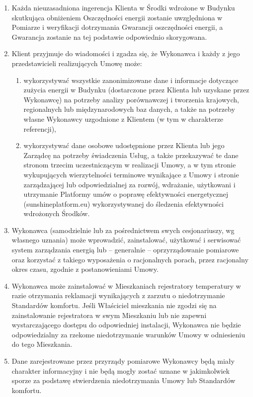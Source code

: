 \begin{multicols}{2}
\begin{enumerate}
	\item Każda nieuzasadniona ingerencja Klienta w Środki wdrożone w Budynku skutkująca obniżeniem Oszczędności energii zostanie uwzględniona w Pomiarze i weryfikacji dotrzymania Gwarancji oszczędności energii, a Gwarancja zostanie na tej podstawie odpowiednio skorygowana.
	\item Klient przyjmuje do wiadomości i zgadza się, że Wykonawca i każdy z jego przedstawicieli realizujących Umowę może:
	\begin{enumerate}
		\item wykorzystywać wszystkie zanonimizowane dane i informacje dotyczące zużycia energii w Budynku (dostarczone przez Klienta lub uzyskane przez Wykonawcę) na potrzeby analizy porównawczej i tworzenia krajowych, regionalnych lub międzynarodowych baz danych, a także na potrzeby własne Wykonawcy uzgodnione z Klientem (w tym w charakterze referencji),
		\item wykorzystywać dane osobowe udostępnione przez Klienta lub jego Zarządcę na potrzeby świadczenia Usług, a także przekazywać te dane stronom trzecim uczestniczącym w realizacji Umowy, a w tym stronie wykupujących wierzytelności terminowe wynikające z Umowy i stronie zarządzającej lub odpowiedzialnej za rozwój, wdrażanie, użytkowani i utrzymanie Platformy umów o poprawę efektywności energetycznej (sunshineplatform.eu) wykorzystywanej do śledzenia efektywności wdrożonych Środków.
	\end{enumerate}
	\item Wykonawca (samodzielnie lub za pośrednictwem swych cesjonariuszy, wg własnego uznania) może wprowadzić, zainstalować, użytkować i serwisować system zarządzania energią lub – generalnie – oprzyrządowanie pomiarowe oraz korzystać z takiego wyposażenia o racjonalnych porach, przez racjonalny okres czasu, zgodnie z postanowieniami Umowy.
	\item Wykonawca może zainstalować w Mieszkaniach rejestratory temperatury w razie otrzymania reklamacji wynikających z zarzutu o niedotrzymanie Standardów komfortu. Jeśli Właściciel mieszkania nie zgodzi się na zainstalowanie rejestratora w swym Mieszkaniu lub nie zapewni wystarczającego dostępu do odpowiedniej instalacji, Wykonawca nie będzie odpowiedzialny za rzekome niedotrzymanie warunków Umowy w odniesieniu do tego Mieszkania.
	\item Dane zarejestrowane przez przyrządy pomiarowe Wykonawcy będą miały charakter informacyjny i nie będą mogły zostać uznane w jakimkolwiek sporze za podstawę stwierdzenia niedotrzymania Umowy lub Standardów komfortu.
\end{enumerate}


\end{multicols}
